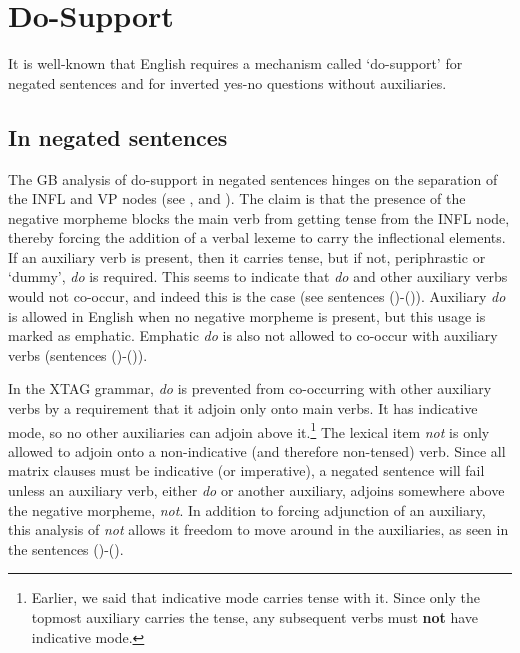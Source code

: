 \section{Do-Support}

It is well-known that English requires a mechanism called `do-support' for
negated sentences and for inverted yes-no questions without auxiliaries.


\subsection{In negated sentences}
\label{do-support-negatives}

The GB analysis of do-support in negated sentences hinges on the separation of
the INFL and VP nodes (see \cite{chomsky65}, \cite{jackendoff72} and
\cite{chomsky86}).  The claim is that the presence of the negative morpheme
blocks the main verb from getting tense from the INFL node, thereby forcing the
addition of a verbal lexeme to carry the inflectional elements.  If an
auxiliary verb is present, then it carries tense, but if not, periphrastic or
`dummy', {\it do} is required.  This seems to indicate that {\it do} and other
auxiliary verbs would not co-occur, and indeed this is the case (see sentences
()-()).  Auxiliary {\it do} is allowed in English when no
negative morpheme is present, but this usage is marked as emphatic.  Emphatic
{\it do} is also not allowed to co-occur with auxiliary verbs (sentences
()-()).


In the XTAG grammar, {\it do} is prevented from co-occurring with other
auxiliary verbs by a requirement that it adjoin only onto main verbs.  It has
indicative mode, so no other auxiliaries can adjoin above it.\footnote{Earlier,
we said that indicative mode carries tense with it.  Since only the topmost
auxiliary carries the tense, any subsequent verbs must {\bf not} have
indicative mode.}  The lexical item {\it not} is only allowed to adjoin onto a
non-indicative (and therefore non-tensed) verb.  Since all matrix clauses must
be indicative (or imperative), a negated sentence will fail unless an auxiliary
verb, either {\it do} or another auxiliary, adjoins somewhere above the
negative morpheme, {\it not}. In addition to forcing adjunction of an
auxiliary, this analysis of {\it not} allows it freedom to move around in the
auxiliaries, as seen in the sentences ()-().

